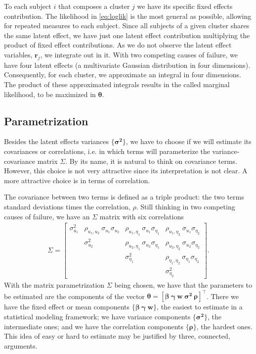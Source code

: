 To each subject \(i\) that composes a cluster \(j\) we have its specific
fixed effects contribution. The likelihood in \autoref{eq:loglik} is the
most general as possible, allowing for repeated measures to each
subject. Since all subjects of a given cluster shares the same latent
effect, we have just one latent effect contribution multiplying the
product of fixed effect contributions. As we do not observe the latent
effect variables, \(\bm{r}_{j}\), we integrate out in it. With two
competing causes of failure, we have four latent effects (a multivariate
Gaussian distribution in four dimensions). Consequently, for each
cluster, we approximate an integral in four dimensions. The product of
these approximated integrals results in the called marginal likelihood,
to be maximized in \(\bm{\theta}\).

\subsection{Parametrization}
\label{cap:parametrization}

Besides the latent effects variances \(\{\bm{\sigma^{2}}\}\), we have to
choose if we will estimate its covariances or correlations, i.e. in
which terms will parameterize the variance-covariance
matrix \(\Sigma\). By its name, it is natural to think on covariance
terms. However, this choice is not very attractive since its
interpretation is not clear. A more attractive choice is in terms of
correlation.

The covariance between two terms is defined as a triple product: the two
terms standard deviations times the correlation, \(\rho\). Still
thinking in two competing causes of failure, we have an \(\Sigma\)
matrix with six correlations
\begin{align*}
 \Sigma = \begin{bmatrix}
           \sigma_{u_{1}}^{2}&
           \rho_{u_{1},u_{2}}~\sigma_{u_{1}}\sigma_{u_{2}}&
           \rho_{u_{1},\eta_{1}}~\sigma_{u_{1}}\sigma_{\eta_{1}}&
           \rho_{u_{1},\eta_{2}}~\sigma_{u_{1}}\sigma_{\eta_{2}}\\
           &\sigma_{u_{2}}^{2}&
           \rho_{u_{2},\eta_{1}}~\sigma_{u_{2}}\sigma_{\eta_{1}}&
           \rho_{u_{2},\eta_{2}}~\sigma_{u_{2}}\sigma_{\eta_{2}}\\
           &&\sigma_{\eta_{1}}^{2}&
           \rho_{\eta_{1},\eta_{2}}~\sigma_{\eta_{1}}\sigma_{\eta_{2}}\\
           &&&\sigma_{\eta_{2}}^{2}
          \end{bmatrix}.
\end{align*}
With the matrix parametrization \(\Sigma\) being chosen, we have that
the parameters to be estimated are the components of the vector
\(\bm{\theta} = [\bm{\beta}~ \bm{\gamma}~\bm{w}~\bm{\sigma^{2}}~
\bm{\rho}]^{\top}\). There we have the fixed effect or mean components
\(\{\bm{\beta}~\bm{\gamma}~\bm{w}\}\), the easiest to estimate in a
statistical modeling framework; we have variance components
\(\{\bm{\sigma^{2}}\}\), the intermediate ones; and we have the
correlation components \(\{\bm{\rho}\}\), the hardest ones. This idea
of easy or hard to estimate may be justified by three, connected,
arguments.


